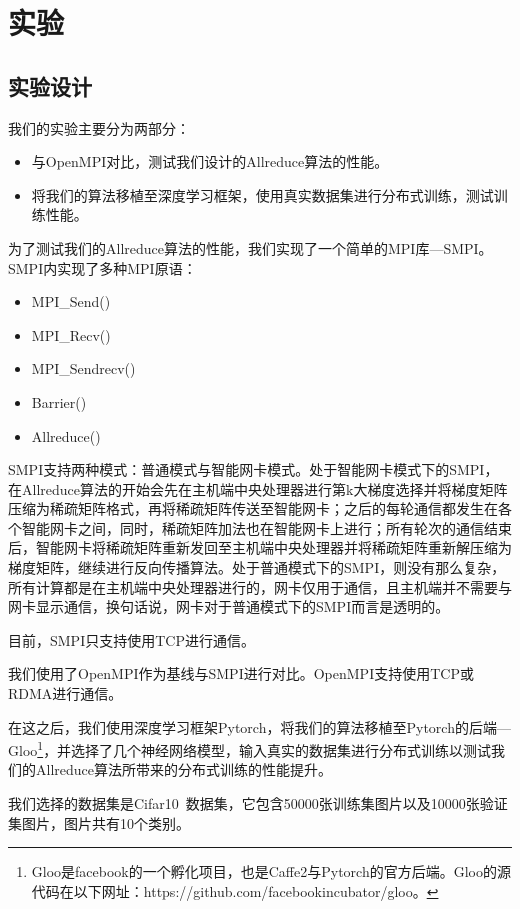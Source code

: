 \chapter{实验}
\label{chap4}

\section{实验设计}
我们的实验主要分为两部分：
\begin{itemize}
    \item 与OpenMPI对比，测试我们设计的Allreduce算法的性能。
    \item 将我们的算法移植至深度学习框架，使用真实数据集进行分布式训练，测试训练性能。
\end{itemize}

为了测试我们的Allreduce算法的性能，我们实现了一个简单的MPI库---SMPI。SMPI内实现了多种MPI原语：
\begin{itemize}
    \item MPI\_Send()
    \item MPI\_Recv()
    \item MPI\_Sendrecv()
    \item Barrier()
    \item Allreduce()
\end{itemize}

SMPI支持两种模式：普通模式与智能网卡模式。处于智能网卡模式下的SMPI，在Allreduce算法的开始会先在主机端中央处理器进行第k大梯度选择并将梯度矩阵压缩为稀疏矩阵格式，再将稀疏矩阵传送至智能网卡；之后的每轮通信都发生在各个智能网卡之间，同时，稀疏矩阵加法也在智能网卡上进行；所有轮次的通信结束后，智能网卡将稀疏矩阵重新发回至主机端中央处理器并将稀疏矩阵重新解压缩为梯度矩阵，继续进行反向传播算法。处于普通模式下的SMPI，则没有那么复杂，所有计算都是在主机端中央处理器进行的，网卡仅用于通信，且主机端并不需要与网卡显示通信，换句话说，网卡对于普通模式下的SMPI而言是透明的。

目前，SMPI只支持使用TCP进行通信。

我们使用了OpenMPI作为基线与SMPI进行对比。OpenMPI支持使用TCP或RDMA进行通信。

在这之后，我们使用深度学习框架Pytorch，将我们的算法移植至Pytorch的后端---Gloo\footnote{Gloo是facebook的一个孵化项目，也是Caffe2与Pytorch的官方后端。Gloo的源代码在以下网址：https://github.com/facebookincubator/gloo。}，并选择了几个神经网络模型，输入真实的数据集进行分布式训练以测试我们的Allreduce算法所带来的分布式训练的性能提升。

我们选择的数据集是Cifar10~\cite{krizhevsky2009learning}数据集，它包含50000张训练集图片以及10000张验证集图片，图片共有10个类别。

